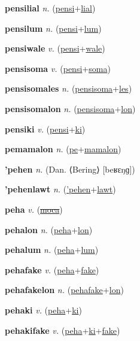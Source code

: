 \textbf{\hypertarget{pensilial}{pensilial}} \textit{n.} (\hyperlink{pensi}{pensi}+\allowbreak \hyperlink{lial}{lial})


\textbf{\hypertarget{pensilum}{pensilum}} \textit{n.} (\hyperlink{pensi}{pensi}+\allowbreak \hyperlink{lum}{lum})


\textbf{\hypertarget{pensiwale}{pensiwale}} \textit{v.} (\hyperlink{pensi}{pensi}+\allowbreak \hyperlink{wale}{wale})


\textbf{\hypertarget{pensisoma}{pensisoma}} \textit{v.} (\hyperlink{pensi}{pensi}+\allowbreak \hyperlink{soma}{soma})


\textbf{\hypertarget{pensisomales}{pensisomales}} \textit{n.} (\hyperlink{pensisoma}{pensisoma}+\allowbreak \hyperlink{les}{les})


\textbf{\hypertarget{pensisomalon}{pensisomalon}} \textit{n.} (\hyperlink{pensisoma}{pensisoma}+\allowbreak \hyperlink{lon}{lon})


\textbf{\hypertarget{pensiki}{pensiki}} \textit{v.} (\hyperlink{pensi}{pensi}+\allowbreak \hyperlink{ki}{ki})


\textbf{\hypertarget{pemamalon}{pemamalon}} \textit{n.} (\hyperlink{pe}{pe}+\allowbreak \hyperlink{mamalon}{mamalon})


\textbf{\hypertarget{'pehen}{'pehen}} \textit{n.} (Dan. ⟨Bering⟩ [beʁɛŋɡ])


\textbf{\hypertarget{'pehenlawt}{'pehenlawt}} \textit{n.} (\hyperlink{'pehen}{'pehen}+\allowbreak \hyperlink{lawt}{lawt})


\textbf{\hypertarget{peha}{peha}} \textit{v.} (\hyperlink{moca}{\sout{moca}})


\textbf{\hypertarget{pehalon}{pehalon}} \textit{n.} (\hyperlink{peha}{peha}+\allowbreak \hyperlink{lon}{lon})


\textbf{\hypertarget{pehalum}{pehalum}} \textit{n.} (\hyperlink{peha}{peha}+\allowbreak \hyperlink{lum}{lum})


\textbf{\hypertarget{pehafake}{pehafake}} \textit{v.} (\hyperlink{peha}{peha}+\allowbreak \hyperlink{fake}{fake})


\textbf{\hypertarget{pehafakelon}{pehafakelon}} \textit{n.} (\hyperlink{pehafake}{pehafake}+\allowbreak \hyperlink{lon}{lon})


\textbf{\hypertarget{pehaki}{pehaki}} \textit{v.} (\hyperlink{peha}{peha}+\allowbreak \hyperlink{ki}{ki})


\textbf{\hypertarget{pehakifake}{pehakifake}} \textit{v.} (\hyperlink{peha}{peha}+\allowbreak \hyperlink{ki}{ki}+\allowbreak \hyperlink{fake}{fake})


